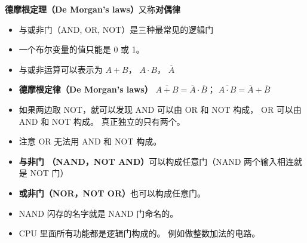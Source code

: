 
\begin{issues}
\issueDraft
\end{issues}

\textbf{德摩根定理（De Morgan's laws）}又称\textbf{对偶律}

\begin{itemize}
\item 与或非门（AND, OR, NOT）是三种最常见的逻辑门
\item 一个布尔变量的值只能是 0 或 1。
\item 与或非运算可以表示为 $A + B$， $A\cdot B$， $\overline A$
\item \textbf{德摩根定律（De Morgan's laws）} $\overline{A+B} = \overline A \cdot \overline B$； $\overline{A \cdot B} = \overline A + \overline B$
\item 如果两边取 NOT，就可以发现 AND 可以由 OR 和 NOT 构成， OR 可以由 AND 和 NOT 构成。 真正独立的只有两个。
\item 注意 OR 无法用 AND 和 NOT 构成。
\item \textbf{与非门 （NAND，NOT AND）}可以构成任意门（NAND 两个输入相连就是 NOT 门）
\item \textbf{或非门（NOR，NOT OR）}也可以构成任意门。 
\item NAND 闪存的名字就是 NAND 门命名的。
\item CPU 里面所有功能都是逻辑门构成的。 例如做整数加法的电路。
\end{itemize}
